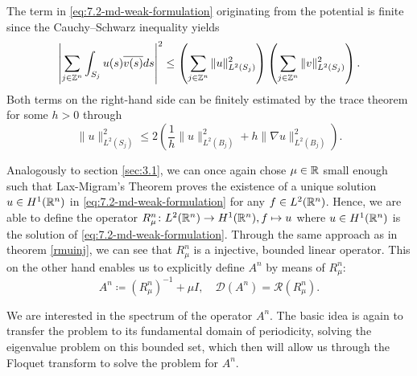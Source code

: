 \begin{remark}
	The term in \eqref{eq:7.2-md-weak-formulation} originating from the potential is finite since the Cauchy–Schwarz inequality yields
	\[ \left| \sum_{j \in \mathbb{Z}^{n}} \int_{S_{j}} u(s) \overline{v(s)} ds \right|^{2} \leq \left( \sum_{j \in \mathbb{Z}^{n}} \| u \|_{L^{2}(S_{j})}^{2} \right) \left( \sum_{j \in \mathbb{Z}^{n}} \| v \|_{L^{2}(S_{j})}^{2} \right). \] 
	Both terms on the right-hand side can be finitely estimated by the trace theorem \cite[page 258]{evans1998partial} for some $h > 0$ through
	\[ \| u \|_{L^{2}(S_{j})}^{2} \leq 2 \left( \frac{1}{h} \|u\|_{L^{2}(B_{j})}^{2} + h \| \nabla u \|_{L^{2}(B_{j})}^{2} \right). \]
\end{remark}

Analogously to section \ref{sec:3.1}, we can once again chose $\mu \in \mathbb{R}$ small enough such that Lax-Migram's Theorem proves the existence of a unique solution $u \in H^{1}(\mathbb{R}^{n})$ in \eqref{eq:7.2-md-weak-formulation} for any $f \in L^{2}(\mathbb{R}^{n})$. Hence, we are able to define the operator $R_{\mu}^{n} \colon L^{2}(\mathbb{R}^{n}) \rightarrow H^{1}(\mathbb{R}^{n}), f \mapsto u$ where $u \in H^{1}(\mathbb{R}^{n})$ is the solution of \eqref{eq:7.2-md-weak-formulation}. Through the same approach as in theorem \ref{rmuinj}, we can see that $R_{\mu}^{n}$ is a injective, bounded linear operator. This on the other hand enables us to explicitly define $A^{n}$ by means of $R_{\mu}^{n}$:
\[ A^{n} \coloneqq \left(R_{\mu}^{n}\right)^{-1} + \mu I, \quad \mathcal{D}(A^{n}) = \mathcal{R}(R_{\mu}^{n}). \]

We are interested in the spectrum of the operator $A^{n}$. The basic idea is again to transfer the problem to its fundamental domain of periodicity, solving the eigenvalue problem on this bounded set, which then will allow us through the Floquet transform to solve the problem for $A^{n}$.

